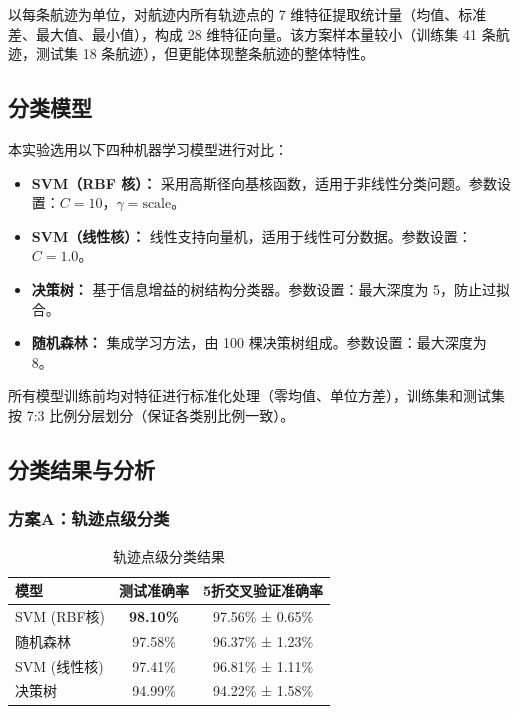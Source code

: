 \documentclass[12pt,a4paper]{ctexart}
\begin{document}
以每条航迹为单位，对航迹内所有轨迹点的 7 维特征提取统计量（均值、标准差、最大值、最小值），构成 28 维特征向量。该方案样本量较小（训练集 41 条航迹，测试集 18 条航迹），但更能体现整条航迹的整体特性。

\subsection{分类模型}

本实验选用以下四种机器学习模型进行对比：

\begin{itemize}[leftmargin=*]
    \item \textbf{SVM（RBF 核）：} 采用高斯径向基核函数，适用于非线性分类问题。参数设置：$C=10$，$\gamma = \text{scale}$。
    \item \textbf{SVM（线性核）：} 线性支持向量机，适用于线性可分数据。参数设置：$C=1.0$。
    \item \textbf{决策树：} 基于信息增益的树结构分类器。参数设置：最大深度为 5，防止过拟合。
    \item \textbf{随机森林：} 集成学习方法，由 100 棵决策树组成。参数设置：最大深度为 8。
\end{itemize}

所有模型训练前均对特征进行标准化处理（零均值、单位方差），训练集和测试集按 7:3 比例分层划分（保证各类别比例一致）。

\subsection{分类结果与分析}

\subsubsection{方案A：轨迹点级分类}

\begin{table}[H]
\centering
\caption{轨迹点级分类结果}
\begin{tabular}{lcc}
\toprule
\textbf{模型} & \textbf{测试准确率} & \textbf{5折交叉验证准确率} \\
\midrule
SVM (RBF核) & \textbf{98.10\%} & 97.56\% ± 0.65\% \\
随机森林    & 97.58\% & 96.37\% ± 1.23\% \\
SVM (线性核) & 97.41\% & 96.81\% ± 1.11\% \\
决策树      & 94.99\% & 94.22\% ± 1.58\% \\
\bottomrule
\end{tabular}
\end{table}
\end{document}
